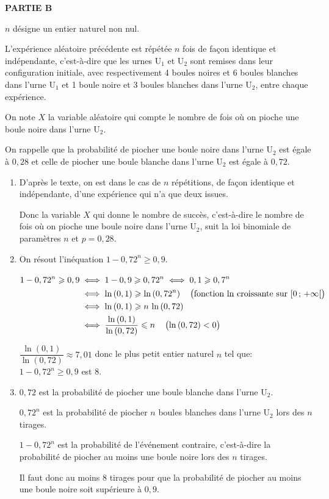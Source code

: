 \bigskip

\textbf{PARTIE B}

\medskip

$n$ désigne un entier naturel non nul.

L'expérience aléatoire précédente est répétée $n$ fois de façon identique et indépendante, c'est-à-dire que les urnes U$_1$ et U$_2$ sont remises dans leur configuration initiale, avec respectivement 4 boules noires et 6 boules blanches dans l'urne U$_1$ et 1 boule noire et 3 boules blanches dans l'urne U$_2$, entre chaque expérience.

On note $X$ la variable aléatoire qui compte le nombre de fois où on pioche une boule noire dans l'urne U$_2$.

On rappelle que la probabilité de piocher une boule noire dans l'urne U$_2$ est égale à $0,28$ et celle de piocher une boule blanche dans l'urne U$_2$ est égale à $0,72$.

\medskip

\begin{enumerate}
\item 
D'après le texte, on est dans le cas de $n$ répétitions,  de façon identique et indépendante, d'une expérience qui n'a que deux issues.

Donc la variable $X$ qui donne le nombre de succès, c'est-à-dire le nombre  de fois où on pioche une boule noire dans l'urne U$_2$, suit la loi binomiale de paramètres $n$ et $p= 0,28$.

\item 
On résout l'inéquation $1 - 0,72^n \geqslant 0,9.$

$\begin{aligned}[t]
1 - 0,72^n \geqslant 0,9
& \iff 1-0,9 \geqslant 0,72^n
\iff 0,1 \geqslant 0,7^n\\
& \iff \ln\left (0,1\right ) \geqslant \ln \left ( 0,72^n\right ) \quad \left (\text{fonction ln croissante sur }[0\,;\,+\infty[\strut\right )\\
& \iff \ln\left (0,1\right ) \geqslant n\,\ln \left ( 0,72\right )\\
& \iff \dfrac{\ln\left (0,1\right )}{\ln \left ( 0,72\right )} \leqslant n \quad \left (\ln\left (0,72\right )<0\strut\right )
\end{aligned}$

$ \dfrac{\ln\left (0,1\right )}{\ln \left ( 0,72\right )} \approx 7,01$ donc le plus petit entier naturel $n$ tel que:  $1 - 0,72^n \geqslant 0,9$ est 8.

\item
$0,72$ est la probabilité de piocher une boule blanche dans l'urne U$_2$.

$0,72^n$ est la probabilité de piocher $n$ boules blanches dans l'urne U$_2$ lors des $n$ tirages.

$1-0,72^n$ est la probabilité de l'événement contraire, c'est-à-dire la probabilité de piocher au moins une boule noire lors des $n$ tirages.

Il faut donc au moins 8 tirages pour que la probabilité de piocher au moins une boule noire soit supérieure à $0,9$.

\end{enumerate}

